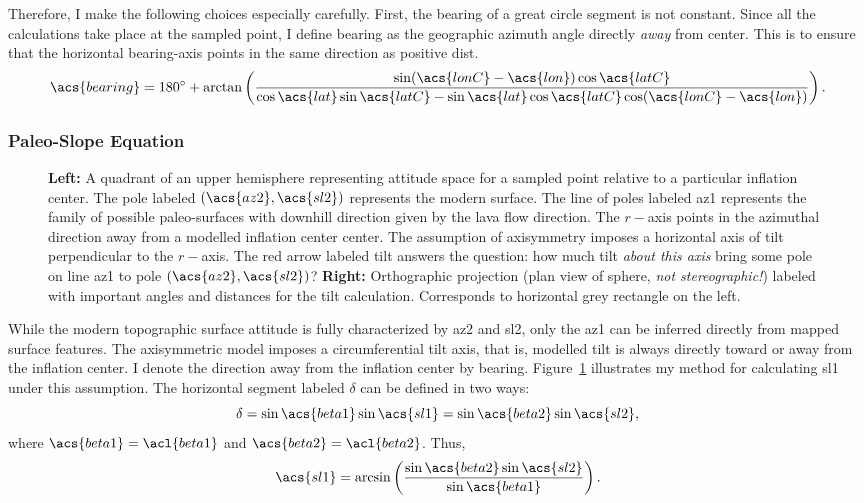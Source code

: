 Therefore, I make the following choices especially carefully. First, the bearing of a great circle segment is not constant. Since all the calculations take place at the sampled point, I define \acs{bearing} as the geographic azimuth angle directly \emph{away} from \acs{center}. This is to ensure that the horizontal \acs{bearing}-axis points in the same direction as positive \acs{dist}.
\begin{equation}
    \acs{bearing} = \ang{180} + \arctan\left(\frac{\sin(\acs{lonC}-\acs{lon})\cos\acs{latC}} {\cos\acs{lat} \sin\acs{latC}-\sin\acs{lat}\cos\acs{latC}\cos(\acs{lonC}-\acs{lon})}\right).
\end{equation} 

\subsubsection{Paleo-Slope Equation}\label{sec:paleo-slope}

\begin{figure}
\begin{center}
    \caption[\Acl{tilt} from mapping]{\textbf{Left:} A quadrant of an upper hemisphere representing attitude space for a sampled point relative to a particular inflation center. The pole labeled $\left(\acs{az2},\acs{sl2}\right)$ represents the modern surface. The line of poles labeled \acs{az1} represents the family of possible paleo-surfaces with downhill direction given by the lava flow direction. The $r-$axis points in the azimuthal direction away from a modelled inflation center \acs{center}. The assumption of axisymmetry imposes a horizontal axis of tilt perpendicular to the $r-$axis. The red arrow labeled \acs{tilt} answers the question: how much tilt \emph{about this axis} bring some pole on line \acs{az1} to pole $\left(\acs{az2},\acs{sl2}\right)$? \textbf{Right:} Orthographic projection (plan view of sphere, \emph{not stereographic!}) labeled with important angles and distances for the tilt calculation. Corresponds to horizontal grey rectangle on the left.}%
    \label{fig:tilt-from-map}%
\end{center}
\end{figure}
While the modern topographic surface attitude is fully characterized by \acs{az2} and \acs{sl2}, only the \acf{az1} can be inferred directly from mapped surface features. The axisymmetric model imposes a circumferential tilt axis, that is, modelled tilt is always directly toward or away from the inflation center. I denote the direction away from the inflation center by \acs{bearing}. Figure~\ref{fig:tilt-from-map} illustrates my method for calculating \acf{sl1} under this assumption. The horizontal segment labeled $\delta$ can be defined in two ways:
\begin{equation*}
    \delta = \sin\acs{beta1}\sin\acs{sl1} = \sin\acs{beta2}\sin\acs{sl2},
\end{equation*}
where $\acs{beta1} = \acl{beta1}$ and $\acs{beta2} = \acl{beta2}$. Thus,
\begin{equation}
    \acs{sl1} = \arcsin\left(\frac{\sin\acs{beta2}\sin\acs{sl2}}{\sin\acs{beta1}}\right).\label{eq:sl1}
\end{equation}

